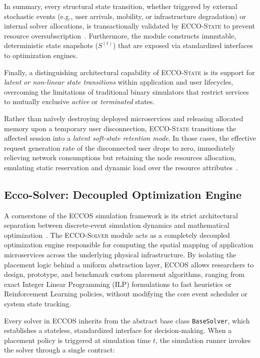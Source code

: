 \documentclass[ASNA]{USG} %
\begin{document}
In summary, every structural state transition, whether triggered by external stochastic events (e.g., user arrivals, mobility, or infrastructure degradation) or internal solver allocations, is transactionally validated by \textsc{ECCO-State} to prevent resource oversubscription~\cite{Qiu2025Cloud}. Furthermore, the module constructs immutable, deterministic state snapshots ($S^{(t)}$) that are exposed via standardized interfaces to optimization engines.

Finally, a distinguishing architectural capability of \textsc{ECCO-State} is its support for \emph{latent or non-linear state transitions} within application and user lifecycles, overcoming the limitations of traditional binary simulators that restrict services to mutually exclusive \emph{active} or \emph{terminated} states.

Rather than naïvely destroying deployed microservices and releasing allocated memory upon a temporary user disconnection, \textsc{ECCO-State} transitions the affected session into a \emph{latent soft-state retention mode}. In those cases, the effective request generation rate of the disconnected user drops to zero, immediately relieving network consumptions but retaining the node resources allocation, emulating static reservation and dynamic load over the resource attributes~\cite{Yi2024Mobile}.

\subsection{Ecco-Solver: Decoupled Optimization Engine}
\label{sec:ecco_solver}

A cornerstone of the \textsc{ECCOS} simulation framework is its strict architectural separation between discrete-event simulation dynamics and mathematical optimization~\cite{Soykan2024Optimizing}. The \textsc{ECCO-Solver} module acts as a completely decoupled optimization engine responsible for computing the spatial mapping of application microservices across the underlying physical infrastructure. By isolating the placement logic behind a uniform abstraction layer, \textsc{ECCOS} allows researchers to design, prototype, and benchmark custom placement algorithms, ranging from exact Integer Linear Programming (ILP) formulations to fast heuristics or Reinforcement Learning policies, without modifying the core event scheduler or system state tracking.

Every solver in ECCOS inherits from the abstract base class \texttt{BaseSolver}, which establishes a stateless, standardized interface for decision-making. When a placement policy is triggered at simulation time $t$, the simulation runner invokes the solver through a single contract:
\end{document}
